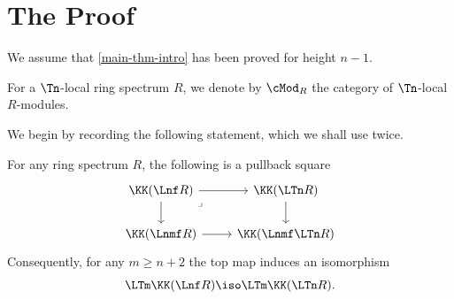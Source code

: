 \section*{The Proof}

\begin{indhyp}\label{inductive-assumption}
	We assume that \cref{main-thm-intro} has been proved for height $n-1$.
\end{indhyp}

\begin{notn}
	For a $\Tn$-local ring spectrum $R$, we denote by $\cMod_R$ the category of $\Tn$-local $R$-modules.
\end{notn}

We begin by recording the following statement, which we shall use twice.

\begin{prop}\label{fracture}
	For any ring spectrum $R$, the following is a pullback square
	\[\begin{tikzcd}
		{\KK(\Lnf R)} & {\KK(\LTn R)} \\
		{\KK(\Lnmf R)} & {\KK(\Lnmf\LTn R)}
		\arrow[from=1-1, to=1-2]
		\arrow[from=1-1, to=2-1]
		\arrow["\lrcorner"{anchor=center, pos=0.125}, draw=none, from=1-1, to=2-2]
		\arrow[from=1-2, to=2-2]
		\arrow[from=2-1, to=2-2]
	\end{tikzcd}\]
	Consequently, for any $m \geq n{+}2$ the top map induces an isomorphism
	\[
		\LTm \KK(\Lnf R) \iso \LTm \KK(\LTn R).
	\]
\end{prop}

